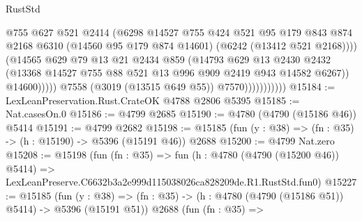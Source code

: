 \begin{lexlean}{RustStd}
\begin{coremodule}
                                    @755
                                    @627
                                    @521
                                    @2414
                                    (@6298
                                      @14527
                                      @755
                                      @424
                                      @521
                                      @95
                                      @179
                                      @843
                                      @874
                                      @2168
                                      @6310
                                      (@14560 @95 @179 @874 @14601)
                                      (@6242 (@13412 @521 @2168))))
                                  (@14565
                                    @629
                                    @79
                                    @13
                                    @21
                                    @2434
                                    @859
                                    (@14793
                                      @629
                                      @13
                                      @2430
                                      @2432
                                      (@13368
                                        @14527
                                        @755
                                        @88
                                        @521
                                        @13
                                        @996
                                        @909
                                        @2419
                                        @943
                                        @14582
                                        @6267))
                                    @14600)))))
                          @7558
                          (@3019 (@13515 @649 @55))
                          @7570)))))))))))
@15184 := LexLeanPreservation.Rust.CrateOK @4788 @2806 @5395
@15185 := Nat.casesOn.{0}
@15186 := @4799 @2685
@15190 := @4780 (@4790 (@15186 @46)) @5414
@15191 := @4799 @2682
@15198 := @15185 (fun (y : @38) => (fn : @35) -> (h : @15190) -> @5396 (@15191 @46)) @2688
@15200 := @4799 Nat.zero
@15208 := @15198
    (fun (fn : @35) =>
    fun (h : @4780 (@4790 (@15200 @46)) @5414) =>
    LexLeanPreserve.C6632b3a2e999d115038026ca828209de.R1.RustStd.fun0)
@15227 := @15185
    (fun (y : @38) => (fn : @35) -> (h : @4780 (@4790 (@15186 @51)) @5414) -> @5396 (@15191 @51))
    @2688
    (fun (fn : @35) =>

\end{coremodule}
\end{lexlean}
